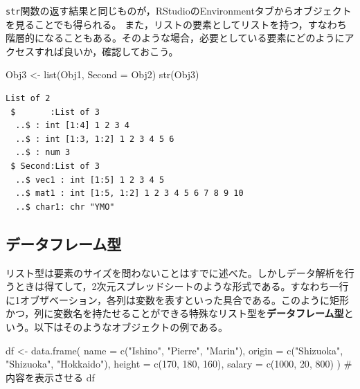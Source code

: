 \documentclass[
  a4paper,
]{ltjsbook}
\newenvironment{Shaded}{\begin{snugshade}}{\end{snugshade}}
\newcommand{\AttributeTok}[1]{\textcolor[rgb]{0.40,0.45,0.13}{#1}}
\newcommand{\CommentTok}[1]{\textcolor[rgb]{0.37,0.37,0.37}{#1}}
\newcommand{\DecValTok}[1]{\textcolor[rgb]{0.68,0.00,0.00}{#1}}
\newcommand{\FunctionTok}[1]{\textcolor[rgb]{0.28,0.35,0.67}{#1}}
\newcommand{\NormalTok}[1]{\textcolor[rgb]{0.00,0.23,0.31}{#1}}
\newcommand{\OtherTok}[1]{\textcolor[rgb]{0.00,0.23,0.31}{#1}}
\newcommand{\StringTok}[1]{\textcolor[rgb]{0.13,0.47,0.30}{#1}}
\begin{document}
\texttt{str}関数の返す結果と同じものが，RStudioのEnvironmentタブからオブジェクトを見ることでも得られる。
また，リストの要素としてリストを持つ，すなわち階層的になることもある。そのような場合，必要としている要素にどのようにアクセスすれば良いか，確認しておこう。

\begin{Shaded}
\begin{Highlighting}[]
\NormalTok{Obj3 }\OtherTok{\textless{}{-}} \FunctionTok{list}\NormalTok{(Obj1, }\AttributeTok{Second =}\NormalTok{ Obj2)}
\FunctionTok{str}\NormalTok{(Obj3)}
\end{Highlighting}
\end{Shaded}

\begin{verbatim}
List of 2
 $       :List of 3
  ..$ : int [1:4] 1 2 3 4
  ..$ : int [1:3, 1:2] 1 2 3 4 5 6
  ..$ : num 3
 $ Second:List of 3
  ..$ vec1 : int [1:5] 1 2 3 4 5
  ..$ mat1 : int [1:5, 1:2] 1 2 3 4 5 6 7 8 9 10
  ..$ char1: chr "YMO"
\end{verbatim}

\subsection{データフレーム型}\label{ux30c7ux30fcux30bfux30d5ux30ecux30fcux30e0ux578b}

リスト型は要素のサイズを問わないことはすでに述べた。しかしデータ解析を行うときは得てして，2次元スプレッドシートのような形式である。すなわち一行に1オブザベーション，各列は変数を表すといった具合である。このように矩形かつ，列に変数名を持たせることができる特殊なリスト型を\textbf{データフレーム型}という。以下はそのようなオブジェクトの例である。

\begin{Shaded}
\begin{Highlighting}[]
\NormalTok{df }\OtherTok{\textless{}{-}} \FunctionTok{data.frame}\NormalTok{(}
  \AttributeTok{name =} \FunctionTok{c}\NormalTok{(}\StringTok{"Ishino"}\NormalTok{, }\StringTok{"Pierre"}\NormalTok{, }\StringTok{"Marin"}\NormalTok{),}
  \AttributeTok{origin =} \FunctionTok{c}\NormalTok{(}\StringTok{"Shizuoka"}\NormalTok{, }\StringTok{"Shizuoka"}\NormalTok{, }\StringTok{"Hokkaido"}\NormalTok{),}
  \AttributeTok{height =} \FunctionTok{c}\NormalTok{(}\DecValTok{170}\NormalTok{, }\DecValTok{180}\NormalTok{, }\DecValTok{160}\NormalTok{),}
  \AttributeTok{salary =} \FunctionTok{c}\NormalTok{(}\DecValTok{1000}\NormalTok{, }\DecValTok{20}\NormalTok{, }\DecValTok{800}\NormalTok{)}
\NormalTok{)}
\CommentTok{\# 内容を表示させる}
\NormalTok{df}
\end{Highlighting}
\end{Shaded}
\end{document}
